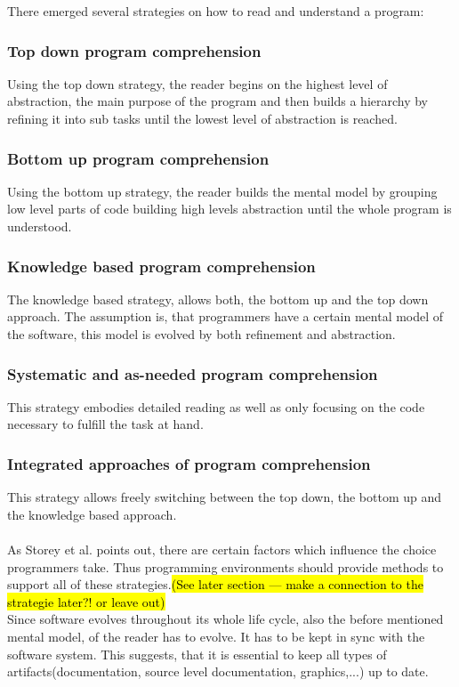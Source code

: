 There emerged several strategies on how to read and understand a program\cite{Storey:1999:CDE:308936.308940}\cite{Storey:1997:PUT:832304.836998}:
\subsubsection*{Top down program comprehension}
Using the top down strategy, the reader begins on the highest level of abstraction, the main purpose of the program and then builds a hierarchy by refining it into sub tasks until the lowest level of abstraction is reached.
\subsubsection*{Bottom up program comprehension} Using the bottom up strategy, the reader builds the mental model by grouping low level parts of code building high levels abstraction until the whole program is understood.
\subsubsection*{Knowledge based program comprehension} The knowledge based strategy, allows both, the bottom up and the top down approach. The assumption is, that programmers have a certain mental model of the software, this model is evolved by both refinement and abstraction.
\subsubsection*{Systematic and as-needed program comprehension} This strategy embodies detailed reading as well as only focusing on the code necessary to fulfill the task at hand.
\subsubsection*{Integrated approaches of program comprehension} This strategy allows freely switching between the top down, the bottom up and the knowledge based approach.
\\\\
As Storey et al.\cite{Storey:1999:CDE:308936.308940} points out, there are certain factors which influence the choice programmers take. Thus programming environments should provide methods to support all of these strategies.\hl{(See later section --- make a connection to the strategie later?! or leave out)}
\\
Since software evolves throughout its whole life cycle, also the before mentioned mental model, of the reader has to evolve. It has to be kept in sync with the software system. This suggests, that it is essential to keep all types of artifacts(documentation, source level documentation, graphics,...) up to date.

